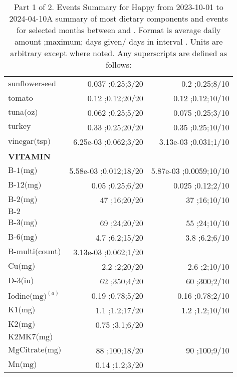 \begin{table}[H]
\begin{tabular}{|l|r|r|}
$\textrm{sunflowerseed}$&0.037 ;0.25;3/20&0.2 ;0.25;8/10\\
$\textrm{tomato}$&0.12 ;0.12;20/20&0.12 ;0.12;10/10\\
$\textrm{tuna(oz)}$&0.062 ;0.25;5/20&0.075 ;0.25;3/10\\
$\textrm{turkey}$&0.33 ;0.25;20/20&0.35 ;0.25;10/10\\
$\textrm{vinegar(tsp)}$&6.25e-03 ;0.062;3/20&3.13e-03 ;0.031;1/10\\
{\bf VITAMIN}&&\\
$\textrm{B-1(mg)}$&5.58e-03 ;0.012;18/20&5.87e-03 ;0.0059;10/10\\
$\textrm{B-12(mg)}$&0.05 ;0.25;6/20&0.025 ;0.12;2/10\\
$\textrm{B-2(mg)}$&47 ;16;20/20&37 ;16;10/10\\
$\textrm{B-2}$&&\\
$\textrm{B-3(mg)}$&69 ;24;20/20&55 ;24;10/10\\
$\textrm{B-6(mg)}$&4.7 ;6.2;15/20&3.8 ;6.2;6/10\\
$\textrm{B-multi(count)}$&3.13e-03 ;0.062;1/20&\\
$\textrm{Cu(mg)}$&2.2 ;2;20/20&2.6 ;2;10/10\\
$\textrm{D-3(iu)}$&62 ;350;4/20&60 ;300;2/10\\
$\textrm{Iodine(mg)}^{\left(a\right)}$&0.19 ;0.78;5/20&0.16 ;0.78;2/10\\
$\textrm{K1(mg)}$&1.1 ;1.2;17/20&1.2 ;1.2;10/10\\
$\textrm{K2(mg)}$&0.75 ;3.1;6/20&\\
$\textrm{K2MK7(mg)}$&&\\
$\textrm{MgCitrate(mg)}$&88 ;100;18/20&90 ;100;9/10\\
$\textrm{Mn(mg)}$&0.14 ;1.2;3/20&\\
\hline
\end{tabular}
\caption{Part 1 of 2.  Events Summary for Happy   from 2023-10-01 to 2024-04-10A summary of most dietary components and events  for selected months between \mjmdatemin and \mjmdatemax. Format is average daily amount ;maximum; days given/ days in interval . Units are arbitrary except where noted. Any  superscripts are defined as follows:  \mjmsuperscripts}
\end{table}
